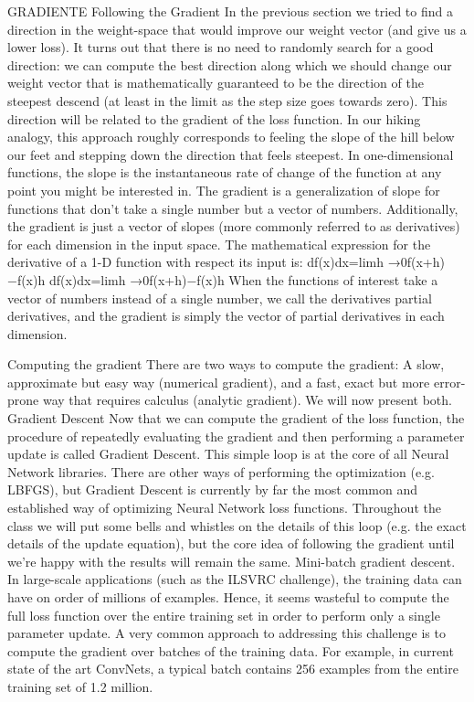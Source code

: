 GRADIENTE Following the Gradient
In the previous section we tried to find a direction in the weight-space that would improve our weight vector (and give us a lower loss). 
It turns out that there is no need to randomly search for a good direction: we can compute the best direction along which we should change our weight vector 
that is mathematically guaranteed to be the direction of the steepest descend (at least in the limit as the step size goes towards zero). 
This direction will be related to the gradient of the loss function. In our hiking analogy, this approach roughly corresponds to feeling the slope of the hill below our feet 
and stepping down the direction that feels steepest.
In one-dimensional functions, the slope is the instantaneous rate of change of the function at any point you might be interested in. 
The gradient is a generalization of slope for functions that don’t take a single number but a vector of numbers. 
Additionally, the gradient is just a vector of slopes (more commonly referred to as derivatives) for each dimension in the input space. 
The mathematical expression for the derivative of a 1-D function with respect its input is:
df(x)dx=limh →0f(x+h)−f(x)h
df(x)dx=limh →0f(x+h)−f(x)h
When the functions of interest take a vector of numbers instead of a single number, we call the derivatives partial derivatives, 
and the gradient is simply the vector of partial derivatives in each dimension.

Computing the gradient
There are two ways to compute the gradient: A slow, approximate but easy way (numerical gradient), and a fast, exact but more error-prone way that requires calculus 
(analytic gradient). We will now present both.
Gradient Descent
Now that we can compute the gradient of the loss function, the procedure of repeatedly evaluating the gradient and then performing a parameter update is called Gradient Descent. 
This simple loop is at the core of all Neural Network libraries. There are other ways of performing the optimization (e.g. LBFGS),
but Gradient Descent is currently by far the most common and established way of optimizing Neural Network loss functions. 
Throughout the class we will put some bells and whistles on the details of this loop (e.g. the exact details of the update equation), 
but the core idea of following the gradient until we’re happy with the results will remain the same.
Mini-batch gradient descent. In large-scale applications (such as the ILSVRC challenge), the training data can have on order of millions of examples. 
Hence, it seems wasteful to compute the full loss function over the entire training set in order to perform only a single parameter update. 
A very common approach to addressing this challenge is to compute the gradient over batches of the training data. For example, in current state of the art ConvNets, 
a typical batch contains 256 examples from the entire training set of 1.2 million.

